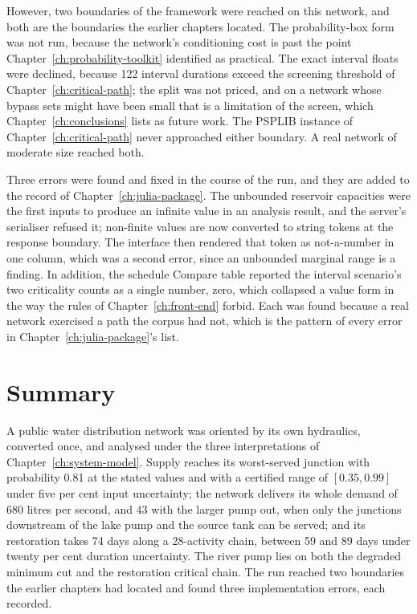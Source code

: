 \documentclass[12pt]{report}
\begin{document}
However, two boundaries of the framework were reached on this network, and both are the
boundaries the earlier chapters located. The probability-box form was not run, because the network's
conditioning cost is past the point Chapter~\ref{ch:probability-toolkit} identified as
practical. The exact interval floats were declined, because 122 interval durations exceed
the screening threshold of Chapter~\ref{ch:critical-path}; the split was not priced, and
on a network whose bypass sets might have been small that is a limitation of the screen, which
Chapter~\ref{ch:conclusions} lists as future work. The PSPLIB instance of
Chapter~\ref{ch:critical-path} never approached either boundary. A real network of
moderate size reached both.

Three errors were found and fixed in the course of the run, and they are added to the
record of Chapter~\ref{ch:julia-package}. The unbounded reservoir capacities were the first
inputs to produce an infinite value in an analysis result, and the server's serialiser
refused it; non-finite values are now converted to string tokens at the response boundary.
The interface then rendered that token as not-a-number in one column, which was a second
error, since an unbounded marginal range is a finding. In addition, the schedule
Compare table reported the interval scenario's two criticality counts as a single number,
zero, which collapsed a value form in the way the rules of Chapter~\ref{ch:front-end}
forbid. Each was found because a real network exercised a path the corpus had not, which
is the pattern of every error in Chapter~\ref{ch:julia-package}'s list.

\section{Summary}
\label{sec:e2e-summary}

A public water distribution network was oriented by its own hydraulics, converted once, and
analysed under the three interpretations of Chapter~\ref{ch:system-model}.
Supply reaches its worst-served junction with probability 0.81 at the stated values and
with a certified range of $[0.35, 0.99]$ under five per cent input uncertainty; the network
delivers its whole demand of 680 litres per second, and 43 with the larger pump out, when
only the junctions downstream of the lake pump and the source tank can be served; and its
restoration takes 74 days along a 28-activity chain, between 59 and 89 days under twenty
per cent duration uncertainty. The river pump lies on both the degraded minimum cut and the
restoration critical chain. The run reached two boundaries the earlier chapters had located
and found three implementation errors, each recorded.

\ifdefined\maindoc
\else
\printbibliography
\end{document}
